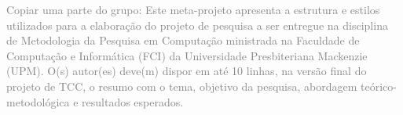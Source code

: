 \maketitle

\begin{resumo} 
  \textcolor{gray}{Copiar uma parte do grupo: Este meta-projeto apresenta a estrutura e estilos utilizados para a elaboração do projeto de pesquisa a ser entregue na disciplina de Metodologia da Pesquisa em Computação ministrada na Faculdade de Computação e Informática (FCI) da Universidade Presbiteriana Mackenzie (UPM). O(s) autor(es) deve(m) dispor em até 10 linhas, na versão final do projeto de TCC, o resumo com o tema, objetivo da pesquisa, abordagem teórico-metodológica e resultados esperados.}
\end{resumo}